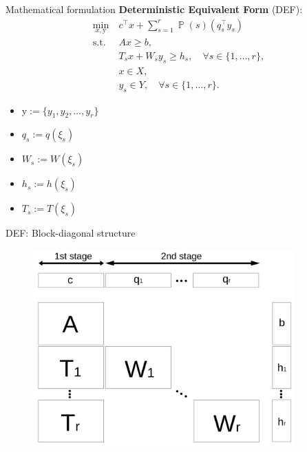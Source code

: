 \documentclass{beamer}
\DeclareMathOperator*{\PP}{\mathbb{P}}
\begin{document}
\begin{frame}{Mathematical formulation}
\textbf{Deterministic Equivalent Form} (DEF):
\begin{subequations}\label{sip:ef}
\begin{align}
\min_{x,\mathrm{y}}\ &c^{\top}x + \sum_{s=1}^{r}\PP(s) (q_s^{\top}y_s) \label{ef:obj}\\ 
\mathrm{s.t.}\ &Ax\ge b,  \label{ef:b}\\
&T_s x+W_s y_s\ge h_s,\quad\forall s\in\{1,\ldots,r\}, \label{ef:c} \\
&x\in X, \label{ef:d} \\
&y_s \in Y,\quad\forall s\in\{1,\ldots,r\}. \label{ef:e}
\end{align}
\end{subequations}
\vspace{-0.4cm}
\begin{itemize}
\item $\mathrm{y}:=\{y_1,y_2,\ldots,y_r\}$
\item $q_s:=q(\xi_s)$
\item $W_s:=W(\xi_s)$
\item $h_s:=h(\xi_s)$
\item $T_s:=T(\xi_s)$
\end{itemize}
\end{frame}

\begin{frame}{DEF: Block-diagonal structure}
\begin{figure}
\begin{center}
\includegraphics[width=0.9\textwidth]{stagewise_sparsity_slide}
\end{center}
\end{figure}
\end{frame}
\end{document}
